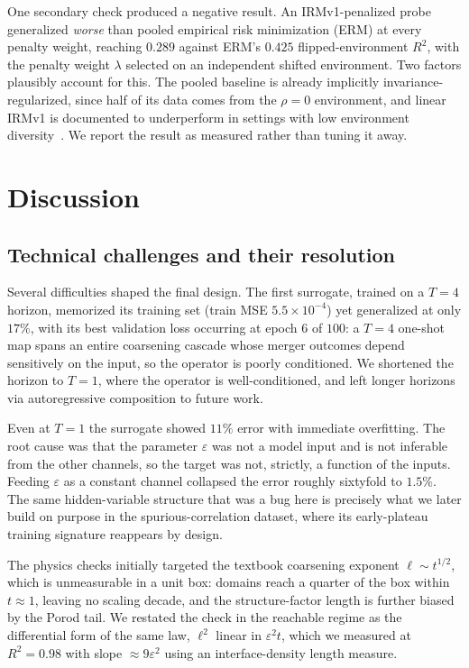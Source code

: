 \documentclass[11pt]{article}
\begin{document}
One secondary check produced a negative result. An IRMv1-penalized probe generalized \emph{worse}
than pooled empirical risk minimization (ERM) at every penalty weight, reaching $0.289$ against
ERM's $0.425$ flipped-environment $R^2$, with the penalty weight $\lambda$ selected on an
independent shifted environment. Two factors plausibly account for this. The pooled baseline is
already implicitly invariance-regularized, since half of its data comes from the $\rho = 0$
environment, and linear IRMv1 is documented to underperform in settings with low environment
diversity~\cite{rosenfeld2021risks}. We report the result as measured rather than tuning it away.

\section{Discussion}

\subsection{Technical challenges and their resolution}

Several difficulties shaped the final design. The first surrogate, trained on a $T=4$ horizon,
memorized its training set (train MSE $5.5\times10^{-4}$) yet generalized at only $17\%$, with its
best validation loss occurring at epoch $6$ of $100$: a $T=4$ one-shot map spans an entire
coarsening cascade whose merger outcomes depend sensitively on the input, so the operator is poorly
conditioned. We shortened the horizon to $T=1$, where the operator is well-conditioned, and left
longer horizons via autoregressive composition to future work.

Even at $T=1$ the surrogate showed $11\%$ error with immediate overfitting. The root cause was that
the parameter $\varepsilon$ was not a model input and is not inferable from the other channels, so
the target was not, strictly, a function of the inputs. Feeding $\varepsilon$ as a constant channel
collapsed the error roughly sixtyfold to $1.5\%$. The same hidden-variable structure that was a bug
here is precisely what we later build on purpose in the spurious-correlation dataset, where its
early-plateau training signature reappears by design.

The physics checks initially targeted the textbook coarsening exponent $\ell \sim t^{1/2}$, which is
unmeasurable in a unit box: domains reach a quarter of the box within $t \approx 1$, leaving no
scaling decade, and the structure-factor length is further biased by the Porod tail. We restated the
check in the reachable regime as the differential form of the same law, $\ell^2$ linear in
$\varepsilon^2 t$, which we measured at $R^2 = 0.98$ with slope $\approx 9\varepsilon^2$ using an
interface-density length measure.
\end{document}
